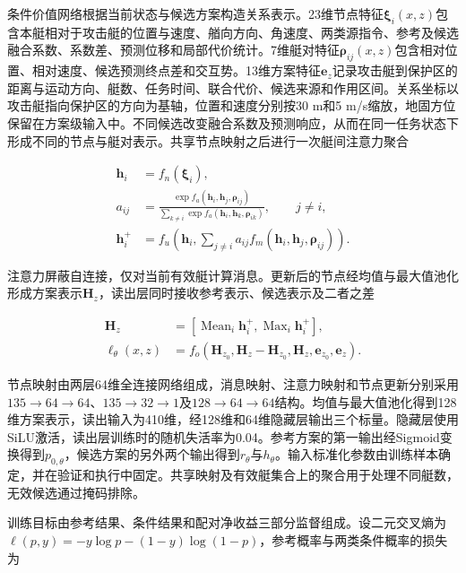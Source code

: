 \documentclass[UTF8,a4paper,zihao=5,fontset=none]{ctexart}
\begin{document}
条件价值网络根据当前状态与候选方案构造关系表示。23维节点特征\(\boldsymbol\xi_i(x,z)\)包含本艇相对于攻击艇的位置与速度、艏向方向、角速度、两类源指令、参考及候选融合系数、系数差、预测位移和局部代价统计。7维艇对特征\(\boldsymbol\rho_{ij}(x,z)\)包含相对位置、相对速度、候选预测终点差和交互势。13维方案特征\(\boldsymbol e_z\)记录攻击艇到保护区的距离与运动方向、艇数、任务时间、联合代价、候选来源和作用区间。关系坐标以攻击艇指向保护区的方向为基轴，位置和速度分别按30 m和5 m/s缩放，地固方位保留在方案级输入中。不同候选改变融合系数及预测响应，从而在同一任务状态下形成不同的节点与艇对表示。共享节点映射之后进行一次艇间注意力聚合

\[
\begin{aligned}
\boldsymbol h_i&=f_n(\boldsymbol\xi_i),\\
a_{ij}&=\frac{\exp f_a(\boldsymbol h_i,\boldsymbol h_j,\boldsymbol\rho_{ij})}
{\sum_{k\ne i}\exp f_a(\boldsymbol h_i,\boldsymbol h_k,\boldsymbol\rho_{ik})},
\qquad j\ne i,\\
\boldsymbol h_i^+&=f_u\!\left(\boldsymbol h_i,
\sum_{j\ne i}a_{ij}f_m(\boldsymbol h_i,\boldsymbol h_j,\boldsymbol\rho_{ij})\right).
\end{aligned}
\tag{27}
\]

注意力屏蔽自连接，仅对当前有效艇计算消息。更新后的节点经均值与最大值池化形成方案表示\(\boldsymbol H_z\)，读出层同时接收参考表示、候选表示及二者之差

\[
\begin{aligned}
\boldsymbol H_z&=\left[\operatorname{Mean}_i\boldsymbol h_i^+,
\operatorname{Max}_i\boldsymbol h_i^+\right],\\
\boldsymbol\ell_\theta(x,z)
&=f_o\!\left(\boldsymbol H_{z_0},\boldsymbol H_z-\boldsymbol H_{z_0},
\boldsymbol H_z,\boldsymbol e_{z_0},\boldsymbol e_z\right).
\end{aligned}
\tag{28}
\]

节点映射由两层64维全连接网络组成，消息映射、注意力映射和节点更新分别采用\(135\!\rightarrow\!64\!\rightarrow\!64\)、\(135\!\rightarrow\!32\!\rightarrow\!1\)及\(128\!\rightarrow\!64\!\rightarrow\!64\)结构。均值与最大值池化得到128维方案表示，读出输入为410维，经128维和64维隐藏层输出三个标量。隐藏层使用SiLU激活，读出层训练时的随机失活率为0.04。参考方案的第一输出经Sigmoid变换得到\(p_{0,\theta}\)，候选方案的另外两个输出得到\(r_\theta\)与\(h_\theta\)。输入标准化参数由训练样本确定，并在验证和执行中固定。共享映射及有效艇集合上的聚合用于处理不同艇数，无效候选通过掩码排除。

训练目标由参考结果、条件结果和配对净收益三部分监督组成。设二元交叉熵为\(\ell(p,y)=-y\log p-(1-y)\log(1-p)\)，参考概率与两类条件概率的损失为
\end{document}
